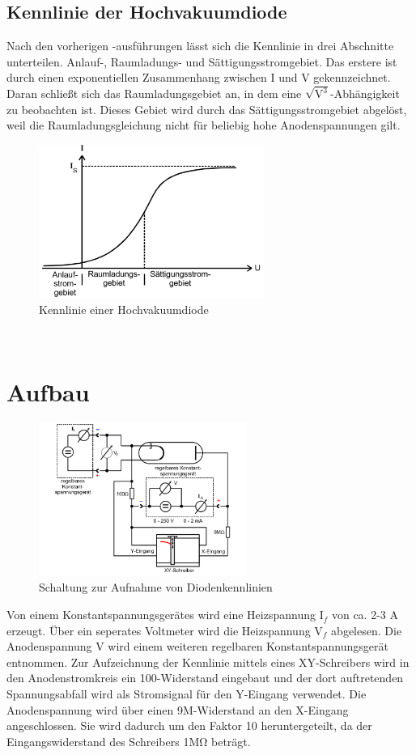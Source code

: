 \subsection{Kennlinie der Hochvakuumdiode}
Nach den vorherigen -ausführungen lässt sich die Kennlinie in drei Abschnitte unterteilen.
Anlauf-, Raumladungs- und Sättigungsstromgebiet.
Das erstere ist durch einen exponentiellen Zusammenhang zwischen I und V gekennzeichnet.
Daran schließt sich das Raumladungsgebiet an, in dem eine $\sqrt{\text{V}^3}$-Abhängigkeit zu beobachten ist.
Dieses Gebiet wird durch das Sättigungsstromgebiet abgelöst, weil die Raumladungsgleichung nicht für beliebig hohe Anodenspannungen gilt.
\begin{figure}
    \centering
    \includegraphics[height=5.0cm]{data/abb6.jpg}
    \caption{Kennlinie einer Hochvakuumdiode \cite{V504}}
    \label{fig:abb6}
\end{figure} \\
\noindent

\section{Aufbau}
\begin{figure}
    \centering
    \includegraphics[height=5.0cm]{data/abb7.jpg}
    \caption{Schaltung zur Aufnahme von Diodenkennlinien \cite{V504}}
    \label{fig:abb7}
\end{figure}
Von einem Konstantspannungsgerätes wird eine Heizspannung $\text{I}_f$ von ca. 2-3 A erzeugt.
Über ein seperates Voltmeter wird die Heizspannung $\text{V}_f$ abgelesen.
Die Anodenspannung V wird einem weiteren regelbaren Konstantspannungsgerät entnommen.
Zur Aufzeichnung der Kennlinie mittels eines XY-Schreibers wird in den Anodenstromkreis ein 100\Omega-Widerstand eingebaut und der dort auftretenden Spannungsabfall wird als Stromsignal für den Y-Eingang verwendet.
Die Anodenspannung wird über einen 9M\Omega-Widerstand an den X-Eingang angeschlossen.
Sie wird dadurch um den Faktor 10 heruntergeteilt, da der Eingangswiderstand des Schreibers 1MΩ beträgt.
